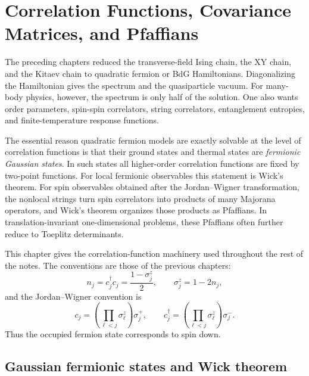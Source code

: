 \chapter{Correlation Functions, Covariance Matrices, and Pfaffians}
\label{chap:correlation-functions-covariance-pfaffians}

The preceding chapters reduced the transverse-field Ising chain, the XY chain,
and the Kitaev chain to quadratic fermion or BdG Hamiltonians.  Diagonalizing the
Hamiltonian gives the spectrum and the quasiparticle vacuum.  For many-body
physics, however, the spectrum is only half of the solution.  One also wants
order parameters, spin-spin correlators, string correlators, entanglement
entropies, and finite-temperature response functions.

The essential reason quadratic fermion models are exactly solvable at the level
of correlation functions is that their ground states and thermal states are
\emph{fermionic Gaussian states}.  In such states all higher-order correlation
functions are fixed by two-point functions.  For local fermionic observables this
statement is Wick's theorem.  For spin observables obtained after the
Jordan--Wigner transformation, the nonlocal strings turn spin correlators into
products of many Majorana operators, and Wick's theorem organizes those products
as Pfaffians.  In translation-invariant one-dimensional problems, these
Pfaffians often further reduce to Toeplitz determinants.

This chapter gives the correlation-function machinery used throughout the rest
of the notes.  The conventions are those of the previous chapters:
\begin{equation}
    n_j=c_j^\dagger c_j=\frac{1-\sigma_j^z}{2},
    \qquad
    \sigma_j^z=1-2n_j,
\end{equation}
and the Jordan--Wigner convention is
\begin{equation}
    c_j=\left(\prod_{\ell<j}\sigma_\ell^z\right)\sigma_j^+,
    \qquad
    c_j^\dagger=\left(\prod_{\ell<j}\sigma_\ell^z\right)\sigma_j^- .
\end{equation}
Thus the occupied fermion state corresponds to spin down.

\section{Gaussian fermionic states and Wick theorem}
\label{sec:gaussian-fermionic-states-wick}

